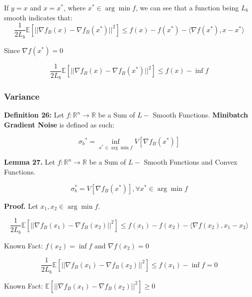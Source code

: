 \noindent If $y = x$ and $x = x^*$, where $x^* \in \arg \min f$, we can see that a function being $L_b$ smooth indicates that: 
\begin{equation}
    \frac{1}{2L_b} \mathbb{E}[||\nabla f_B(x) - \nabla f_B(x^*)||^2] \leq f(x) - f(x^*) - \langle \nabla f(x^*), x - x^* \rangle
\end{equation}

\noindent Since $\nabla f(x^*) = 0$

\begin{equation}
    \frac{1}{2L_b} \mathbb{E}[||\nabla f_B(x) - \nabla f_B(x^*)||^2] \leq f(x) - \inf f
\end{equation}

\subsubsection{Variance}

\noindent \textbf{Definition 26:} Let $f: \mathbb{R}^n \rightarrow \mathbb{R}$ be a Sum of $L-$ Smooth Functions. \textbf{Minibatch Gradient Noise} is defined as such: 

\begin{equation}
    {\sigma_b}^* = \inf_{x^* \in \arg \min f} V[\nabla f_B(x^*)]
\end{equation}

\noindent \textbf{Lemma 27.} Let $f: \mathbb{R}^n \rightarrow \mathbb{R}$ be a Sum of $L-$ Smooth Functions and Convex Functions.

\begin{equation}
    \sigma_b^* = V[\nabla f_B(x^*)], \forall x^* \in \arg \min f
\end{equation}

\noindent \textbf{Proof.} Let $x_1, x_2 \in \arg \min f$.  

\begin{equation}
    \frac{1}{2L_{b}} \mathbb{E}[||\nabla f_B(x_1) - \nabla f_B(x_2)||^2] \leq f(x_1) - f(x_2) - \langle \nabla f(x_2), x_1 - x_2 \rangle
\end{equation}

\noindent Known Fact: $f(x_2) = \inf f$ and $\nabla f(x_2) = 0$ \newline 

\begin{equation}
    \frac{1}{2L_{b}} \mathbb{E}[||\nabla f_B(x_1) - \nabla f_B(x_2)||^2] \leq f(x_1) - \inf f = 0
\end{equation}

\noindent Known Fact: $\mathbb{E}[||\nabla f_B(x_1) - \nabla f_B(x_2)||^2] \geq 0$ \newline 

